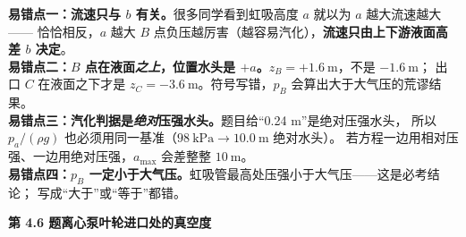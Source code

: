 \begin{yicuo}
\textbf{易错点一：流速只与 $b$ 有关。}很多同学看到虹吸高度 $a$ 就以为 $a$ 越大流速越大——
恰恰相反，$a$ 越大 $B$ 点负压越厉害（越容易汽化），\textbf{流速只由上下游液面高差 $b$ 决定}。\\
\textbf{易错点二：$B$ 点在液面\emph{之上}，位置水头是 $+a$。}$z_B=+1.6\ \mathrm{m}$，不是 $-1.6\ \mathrm{m}$；
出口 $C$ 在液面之下才是 $z_C=-3.6\ \mathrm{m}$。符号写错，$p_B$ 会算出大于大气压的荒谬结果。\\
\textbf{易错点三：汽化判据是\emph{绝对}压强水头。}题目给“0.24 m”是绝对压强水头，
所以 $p_a/(\rho g)$ 也必须用同一基准（$98\ \mathrm{kPa}\to10.0\ \mathrm{m}$ 绝对水头）。
若方程一边用相对压强、一边用绝对压强，$a_{\max}$ 会差整整 $10\ \mathrm{m}$。\\
\textbf{易错点四：$p_B$ 一定小于大气压。}虹吸管最高处压强小于大气压——这是必考结论；
写成“大于”或“等于”都错。
\end{yicuo}

\noindent\textbf{第 4.6 题\quad 离心泵叶轮进口处的真空度}

